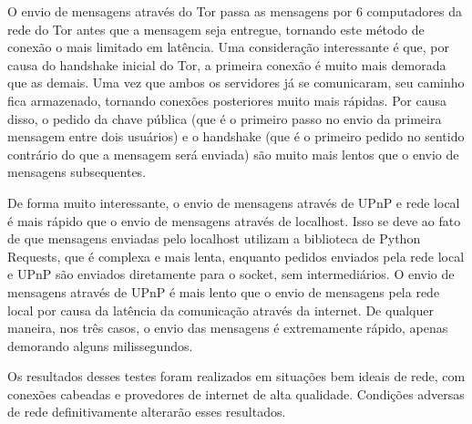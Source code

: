 O envio de mensagens através do Tor passa as mensagens por 6 computadores da rede do Tor antes que a mensagem seja entregue, tornando este método de conexão o mais limitado em latência. Uma consideração interessante é que, por causa do handshake inicial do Tor, a primeira conexão é muito mais demorada que as demais. Uma vez que ambos os servidores já se comunicaram, seu caminho fica armazenado, tornando conexões posteriores muito mais rápidas. Por causa disso, o pedido da chave pública (que é o primeiro passo no envio da primeira mensagem entre dois usuários) e o handshake (que é o primeiro pedido no sentido contrário do que a mensagem será enviada) são muito mais lentos que o envio de mensagens subsequentes.

De forma muito interessante, o envio de mensagens através de UPnP e rede local é mais rápido que o envio de mensagens através de localhost. Isso se deve ao fato de que mensagens enviadas pelo localhost utilizam a biblioteca de Python Requests, que é complexa e mais lenta, enquanto pedidos enviados pela rede local e UPnP são enviados diretamente para o socket, sem intermediários. O envio de mensagens através de UPnP é mais lento que o envio de mensagens pela rede local por causa da latência da comunicação através da internet. De qualquer maneira, nos três casos, o envio das mensagens é extremamente rápido, apenas demorando alguns milissegundos.

Os resultados desses testes foram realizados em situações bem ideais de rede, com conexões cabeadas e provedores de internet de alta qualidade. Condições adversas de rede definitivamente alterarão esses resultados.